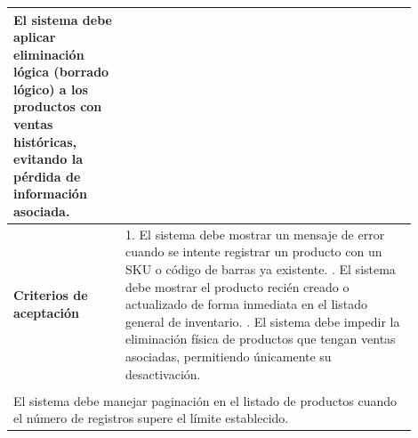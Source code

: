 \begin{longtable}{|p{0.25\linewidth}|p{0.15\linewidth}|p{0.15\linewidth}|p{0.35\linewidth}|}
{		El sistema debe aplicar eliminación lógica (borrado lógico) a los productos con ventas históricas, evitando la pérdida de información asociada.}                                             \\ \hline
		\cellcolor{tableheaderblue}\textbf{Criterios de aceptación} & \multicolumn{3}{p{0.70\linewidth}|}{                                                                                           %
			1. El sistema debe mostrar un mensaje de error cuando se intente registrar un producto con un SKU o código de barras ya existente. \newline
			2. El sistema debe mostrar el producto recién creado o actualizado de forma inmediata en el listado general de inventario. \newline
		3. El sistema debe impedir la eliminación física de productos que tengan ventas asociadas, permitiendo únicamente su desactivación.}                                                         \\ \hline
		\rowcolor{tableheaderblue}
		\multicolumn{4}{|l|}{\textbf{Restricciones}}                                                                                                                                                 \\ \hline
		\multicolumn{4}{|p{0.96\linewidth}|}{%
		El sistema debe manejar paginación en el listado de productos cuando el número de registros supere el límite establecido.}                                                                   \\ \hline
	
\end{longtable}
\endgroup


